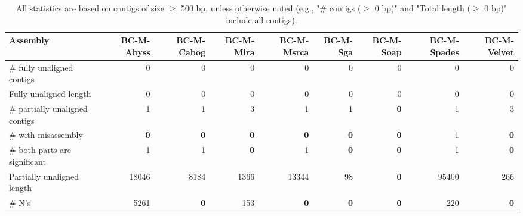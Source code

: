 \documentclass[12pt,a4paper]{article}
\begin{document}
\begin{table}[ht]
\begin{center}
\caption{All statistics are based on contigs of size $\geq$ 500 bp, unless otherwise noted (e.g., "\# contigs ($\geq$ 0 bp)" and "Total length ($\geq$ 0 bp)" include all contigs).}
\begin{tabular}{|l*{8}{|r}|}
\hline
Assembly & BC-M-Abyss & BC-M-Cabog & BC-M-Mira & BC-M-Msrca & BC-M-Sga & BC-M-Soap & BC-M-Spades & BC-M-Velvet \\ \hline
\# fully unaligned contigs & 0 & 0 & 0 & 0 & 0 & 0 & 0 & 0 \\ \hline
Fully unaligned length & 0 & 0 & 0 & 0 & 0 & 0 & 0 & 0 \\ \hline
\# partially unaligned contigs & 1 & 1 & 3 & 1 & 1 & {\bf 0} & 1 & 3 \\ \hline
\hspace{5mm}\# with misassembly & {\bf 0} & {\bf 0} & {\bf 0} & {\bf 0} & {\bf 0} & {\bf 0} & 1 & {\bf 0} \\ \hline
\hspace{5mm}\# both parts are significant & 1 & 1 & {\bf 0} & 1 & {\bf 0} & {\bf 0} & 1 & {\bf 0} \\ \hline
Partially unaligned length & 18046 & 8184 & 1366 & 13344 & 98 & {\bf 0} & 95400 & 266 \\ \hline
\# N's & 5261 & {\bf 0} & 153 & {\bf 0} & {\bf 0} & {\bf 0} & 220 & {\bf 0} \\ \hline
\end{tabular}
\end{center}
\end{table}
\end{document}
